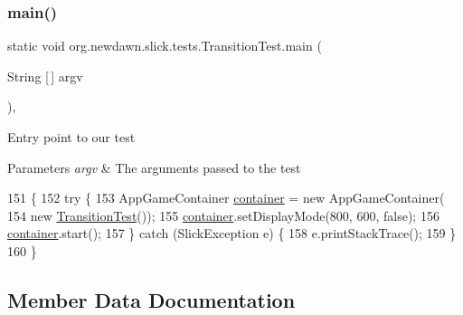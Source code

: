 \subsubsection{\texorpdfstring{main()}{main()}}
{\footnotesize\ttfamily static void org.\+newdawn.\+slick.\+tests.\+Transition\+Test.\+main (\begin{DoxyParamCaption}\item[{String \mbox{[}$\,$\mbox{]}}]{argv }\end{DoxyParamCaption})\hspace{0.3cm}{\ttfamily [inline]}, {\ttfamily [static]}}

Entry point to our test


\begin{DoxyParams}{Parameters}
{\em argv} & The arguments passed to the test \\
\hline
\end{DoxyParams}

\begin{DoxyCode}
151                                            \{
152         \textcolor{keywordflow}{try} \{
153             AppGameContainer \mbox{\hyperlink{classorg_1_1newdawn_1_1slick_1_1state_1_1_state_based_game_a538846600436175cbed48450adfdd025}{container}} = \textcolor{keyword}{new} AppGameContainer(
154                     \textcolor{keyword}{new} \mbox{\hyperlink{classorg_1_1newdawn_1_1slick_1_1tests_1_1_transition_test_ae2a4a1049ab878b413fea99c428a8c28}{TransitionTest}}());
155             \mbox{\hyperlink{classorg_1_1newdawn_1_1slick_1_1state_1_1_state_based_game_a538846600436175cbed48450adfdd025}{container}}.setDisplayMode(800, 600, \textcolor{keyword}{false});
156             \mbox{\hyperlink{classorg_1_1newdawn_1_1slick_1_1state_1_1_state_based_game_a538846600436175cbed48450adfdd025}{container}}.start();
157         \} \textcolor{keywordflow}{catch} (SlickException e) \{
158             e.printStackTrace();
159         \}
160     \}
\end{DoxyCode}


\subsection{Member Data Documentation}
\mbox{\label{classorg_1_1newdawn_1_1slick_1_1tests_1_1_transition_test_afabf315fd18817326974d85af5163dfe}} 
